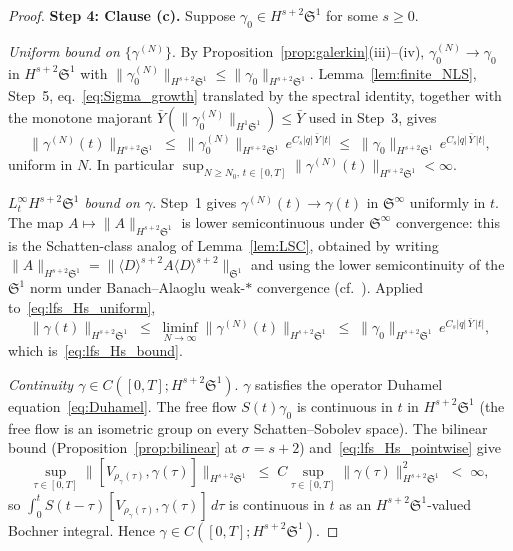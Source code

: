 \documentclass[11pt]{amsart}
\theoremstyle{definition}
\newcommand{\Sp}{\mathfrak{S}}
\begin{document}
\begin{proof}
\smallskip
\noindent\textbf{Step 4: Clause (c).} Suppose $\gamma_0\in H^{s+2}\Sp^1$ for some $s\ge 0.$

\smallskip
\noindent\emph{Uniform bound on $\{\gamma^{(N)}\}.$} By Proposition~\ref{prop:galerkin}(iii)--(iv), $\gamma_0^{(N)}\to\gamma_0$ in $H^{s+2}\Sp^1$ with $\|\gamma_0^{(N)}\|_{H^{s+2}\Sp^1}\le\|\gamma_0\|_{H^{s+2}\Sp^1}.$ Lemma~\ref{lem:finite_NLS}, Step~5, eq.~\eqref{eq:Sigma_growth} translated by the spectral identity, together with the monotone majorant $\bar Y(\|\gamma_0^{(N)}\|_{H^1\Sp^1})\le\bar Y$ used in Step~3, gives
\begin{equation}\label{eq:lfs_Hs_uniform}
  \|\gamma^{(N)}(t)\|_{H^{s+2}\Sp^1}\;\le\;\|\gamma_0^{(N)}\|_{H^{s+2}\Sp^1}\,e^{C_s|q|\,\bar Y\,|t|}\;\le\;\|\gamma_0\|_{H^{s+2}\Sp^1}\,e^{C_s|q|\,\bar Y\,|t|},
\end{equation}
uniform in $N.$ In particular $\sup_{N\ge N_0,\,t\in[0,T]}\|\gamma^{(N)}(t)\|_{H^{s+2}\Sp^1}<\infty.$

\smallskip
\noindent\emph{$L^\infty_t H^{s+2}\Sp^1$ bound on $\gamma.$} Step~1 gives $\gamma^{(N)}(t)\to\gamma(t)$ in $\Sp^\infty$ uniformly in $t.$ The map $A\mapsto\|A\|_{H^{s+2}\Sp^1}$ is lower semicontinuous under $\Sp^\infty$ convergence: this is the Schatten-class analog of Lemma~\ref{lem:LSC}, obtained by writing $\|A\|_{H^{s+2}\Sp^1}=\|\langle D\rangle^{s+2}A\langle D\rangle^{s+2}\|_{\Sp^1}$ and using the lower semicontinuity of the $\Sp^1$ norm under Banach--Alaoglu weak-$*$ convergence (cf.\ \cite[Thm.~2.20]{Simon2005}). Applied to~\eqref{eq:lfs_Hs_uniform},
\begin{equation}\label{eq:lfs_Hs_pointwise}
  \|\gamma(t)\|_{H^{s+2}\Sp^1}\;\le\;\liminf_{N\to\infty}\|\gamma^{(N)}(t)\|_{H^{s+2}\Sp^1}\;\le\;\|\gamma_0\|_{H^{s+2}\Sp^1}\,e^{C_s|q|\,\bar Y\,|t|},
\end{equation}
which is~\eqref{eq:lfs_Hs_bound}.

\smallskip
\noindent\emph{Continuity $\gamma\in C([0,T];H^{s+2}\Sp^1).$} $\gamma$ satisfies the operator Duhamel equation~\eqref{eq:Duhamel}. The free flow $S(t)\gamma_0$ is continuous in $t$ in $H^{s+2}\Sp^1$ (the free flow is an isometric group on every Schatten--Sobolev space). The bilinear bound (Proposition~\ref{prop:bilinear} at $\sigma=s+2$) and~\eqref{eq:lfs_Hs_pointwise} give
\[
  \sup_{\tau\in[0,T]}\|[V_{\rho_\gamma(\tau)},\gamma(\tau)]\|_{H^{s+2}\Sp^1}\;\le\;C\sup_{\tau\in[0,T]}\|\gamma(\tau)\|_{H^{s+2}\Sp^1}^2\;<\;\infty,
\]
so $\int_0^t S(t-\tau)[V_{\rho_\gamma(\tau)},\gamma(\tau)]\,d\tau$ is continuous in $t$ as an $H^{s+2}\Sp^1$-valued Bochner integral. Hence $\gamma\in C([0,T];H^{s+2}\Sp^1).$


\end{proof}
\end{document}
